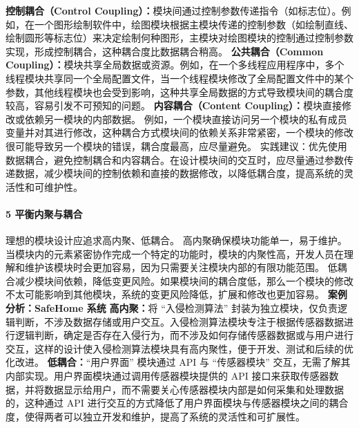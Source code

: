 \textbf{控制耦合（Control
Coupling）：}模块间通过控制参数传递指令（如标志位）。例如，在一个图形绘制软件中，绘图模块根据主模块传递的控制参数（如绘制直线、绘制圆形等标志位）来决定绘制何种图形，主模块对绘图模块的控制通过控制参数实现，形成控制耦合，这种耦合度比数据耦合稍高。
\textbf{公共耦合（Common
Coupling）：}模块共享全局数据或资源。例如，在一个多线程应用程序中，多个线程模块共享同一个全局配置文件，当一个线程模块修改了全局配置文件中的某个参数，其他线程模块也会受到影响，这种共享全局数据的方式导致模块间的耦合度较高，容易引发不可预知的问题。
\textbf{内容耦合（Content Coupling）：}模块直接修改或依赖另一模块的内部数据。
例如，一个模块直接访问另一个模块的私有成员变量并对其进行修改，这种耦合方式模块间的依赖关系非常紧密，一个模块的修改很可能导致另一个模块的错误，耦合度最高，应尽量避免。
实践建议：优先使用数据耦合，避免控制耦合和内容耦合。在设计模块间的交互时，应尽量通过参数传递数据，减少模块间的控制依赖和直接的数据修改，以降低耦合度，提高系统的灵活性和可维护性。 \paragraph{5
平衡内聚与耦合}\label{ux5e73ux8861ux5185ux805aux4e0eux8026ux5408} 理想的模块设计应追求高内聚、低耦合。
高内聚确保模块功能单一，易于维护。当模块内的元素紧密协作完成一个特定的功能时，模块的内聚性高，开发人员在理解和维护该模块时会更加容易，因为只需要关注模块内部的有限功能范围。
低耦合减少模块间依赖，降低变更风险。如果模块间的耦合度低，那么一个模块的修改不太可能影响到其他模块，系统的变更风险降低，扩展和修改也更加容易。 \textbf{案例分析：SafeHome 系统} \textbf{高内聚：}将
``入侵检测算法''
封装为独立模块，仅负责逻辑判断，不涉及数据存储或用户交互。入侵检测算法模块专注于根据传感器数据进行逻辑判断，确定是否存在入侵行为，而不涉及如何存储传感器数据或与用户进行交互，这样的设计使入侵检测算法模块具有高内聚性，便于开发、测试和后续的优化改进。
\textbf{低耦合：}``用户界面'' 模块通过 API 与 ``传感器模块'' 交互，无需了解其内部实现。用户界面模块通过调用传感器模块提供的 API
接口来获取传感器数据，并将数据显示给用户，而不需要关心传感器模块内部是如何采集和处理数据的，这种通过 API 进行交互的方式降低了用户界面模块与传感器模块之间的耦合度，使得两者可以独立开发和维护，提高了系统的灵活性和可扩展性。
